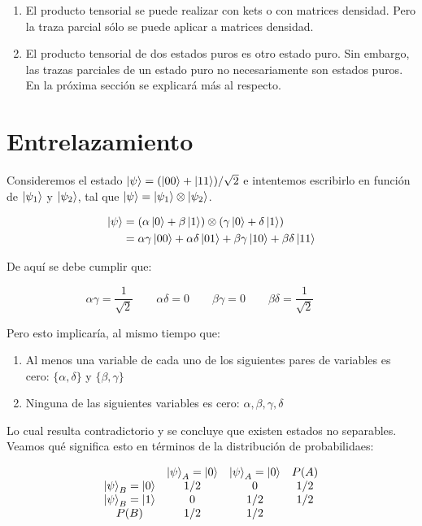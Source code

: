 \begin{enumerate}
    \item El producto tensorial se puede realizar con kets o con matrices densidad. Pero la traza parcial sólo se puede aplicar a matrices densidad.
    \item El producto tensorial de dos estados puros es otro estado puro. Sin embargo, las trazas parciales de un estado puro no necesariamente son estados puros. En la próxima sección se explicará más al respecto.
\end{enumerate}

\section{Entrelazamiento}

Consideremos el estado $\ket{\psi} = (\ket{00} + \ket{11})/\sqrt{2}$ e intentemos escribirlo en función de $\ket{\psi_1}$ y $\ket{\psi_2}$, tal que $\ket{\psi} = \ket{\psi_1} \otimes \ket{\psi_2}$.

\begin{align*}
    \ket{\psi}
    &= (\alpha \ket{0} + \beta \ket{1}) \otimes (\gamma \ket{0} + \delta \ket{1}) \\
    &= \alpha \gamma \ket{00} + \alpha \delta \ket{01} + \beta \gamma \ket{10} + \beta \delta \ket{11}
\end{align*}

De aquí se debe cumplir que:

$$
    \alpha \gamma = \frac{1}{\sqrt{2}} \qquad
    \alpha \delta = 0 \qquad
    \beta \gamma = 0 \qquad
    \beta \delta = \frac{1}{\sqrt{2}} \qquad
$$

Pero esto implicaría, al mismo tiempo que:

\begin{enumerate}
    \item Al menos una variable de cada uno de los siguientes pares de variables es cero: $\{\alpha, \delta\}$ y $\{\beta, \gamma\}$
    \item Ninguna de las siguientes variables es cero: $\alpha, \beta, \gamma, \delta$
\end{enumerate}

Lo cual resulta contradictorio y se concluye que existen estados no separables. Veamos qué significa esto en términos de la distribución de probabilidaes:

\[
\begin{array}{c c c c}
    & \ket{\psi}_A = \ket{0} & \ket{\psi}_A = \ket{0} & P(A) \\
    \ket{\psi}_B = \ket{0} & 1/2 & 0 & 1/2 \\
    \ket{\psi}_B = \ket{1} & 0 & 1/2 & 1/2 \\
    P(B) & 1/2 & 1/2 &
\end{array}
\]

